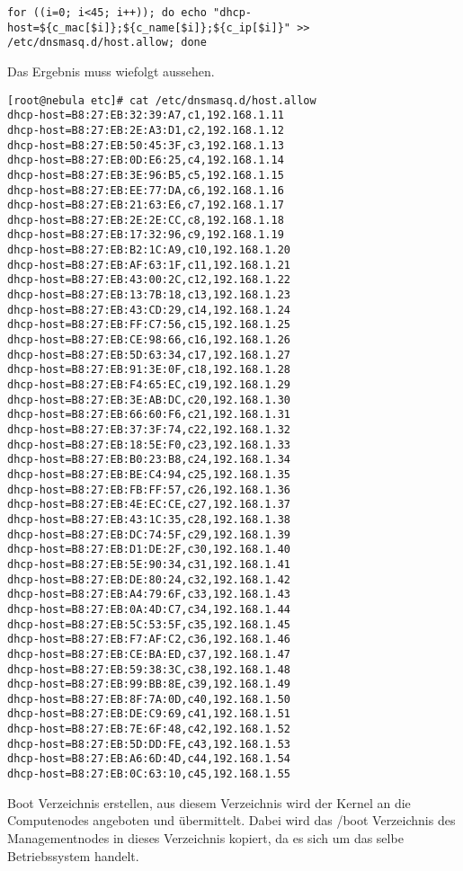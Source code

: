 \begin{lstlisting}
for ((i=0; i<45; i++)); do echo "dhcp-host=${c_mac[$i]};${c_name[$i]};${c_ip[$i]}" >> /etc/dnsmasq.d/host.allow; done
\end{lstlisting}

Das Ergebnis muss wiefolgt aussehen.
\begin{lstlisting}
[root@nebula etc]# cat /etc/dnsmasq.d/host.allow
dhcp-host=B8:27:EB:32:39:A7,c1,192.168.1.11
dhcp-host=B8:27:EB:2E:A3:D1,c2,192.168.1.12
dhcp-host=B8:27:EB:50:45:3F,c3,192.168.1.13
dhcp-host=B8:27:EB:0D:E6:25,c4,192.168.1.14
dhcp-host=B8:27:EB:3E:96:B5,c5,192.168.1.15
dhcp-host=B8:27:EB:EE:77:DA,c6,192.168.1.16
dhcp-host=B8:27:EB:21:63:E6,c7,192.168.1.17
dhcp-host=B8:27:EB:2E:2E:CC,c8,192.168.1.18
dhcp-host=B8:27:EB:17:32:96,c9,192.168.1.19
dhcp-host=B8:27:EB:B2:1C:A9,c10,192.168.1.20
dhcp-host=B8:27:EB:AF:63:1F,c11,192.168.1.21
dhcp-host=B8:27:EB:43:00:2C,c12,192.168.1.22
dhcp-host=B8:27:EB:13:7B:18,c13,192.168.1.23
dhcp-host=B8:27:EB:43:CD:29,c14,192.168.1.24
dhcp-host=B8:27:EB:FF:C7:56,c15,192.168.1.25
dhcp-host=B8:27:EB:CE:98:66,c16,192.168.1.26
dhcp-host=B8:27:EB:5D:63:34,c17,192.168.1.27
dhcp-host=B8:27:EB:91:3E:0F,c18,192.168.1.28
dhcp-host=B8:27:EB:F4:65:EC,c19,192.168.1.29
dhcp-host=B8:27:EB:3E:AB:DC,c20,192.168.1.30
dhcp-host=B8:27:EB:66:60:F6,c21,192.168.1.31
dhcp-host=B8:27:EB:37:3F:74,c22,192.168.1.32
dhcp-host=B8:27:EB:18:5E:F0,c23,192.168.1.33
dhcp-host=B8:27:EB:B0:23:B8,c24,192.168.1.34
dhcp-host=B8:27:EB:BE:C4:94,c25,192.168.1.35
dhcp-host=B8:27:EB:FB:FF:57,c26,192.168.1.36
dhcp-host=B8:27:EB:4E:EC:CE,c27,192.168.1.37
dhcp-host=B8:27:EB:43:1C:35,c28,192.168.1.38
dhcp-host=B8:27:EB:DC:74:5F,c29,192.168.1.39
dhcp-host=B8:27:EB:D1:DE:2F,c30,192.168.1.40
dhcp-host=B8:27:EB:5E:90:34,c31,192.168.1.41
dhcp-host=B8:27:EB:DE:80:24,c32,192.168.1.42
dhcp-host=B8:27:EB:A4:79:6F,c33,192.168.1.43
dhcp-host=B8:27:EB:0A:4D:C7,c34,192.168.1.44
dhcp-host=B8:27:EB:5C:53:5F,c35,192.168.1.45
dhcp-host=B8:27:EB:F7:AF:C2,c36,192.168.1.46
dhcp-host=B8:27:EB:CE:BA:ED,c37,192.168.1.47
dhcp-host=B8:27:EB:59:38:3C,c38,192.168.1.48
dhcp-host=B8:27:EB:99:BB:8E,c39,192.168.1.49
dhcp-host=B8:27:EB:8F:7A:0D,c40,192.168.1.50
dhcp-host=B8:27:EB:DE:C9:69,c41,192.168.1.51
dhcp-host=B8:27:EB:7E:6F:48,c42,192.168.1.52
dhcp-host=B8:27:EB:5D:DD:FE,c43,192.168.1.53
dhcp-host=B8:27:EB:A6:6D:4D,c44,192.168.1.54
dhcp-host=B8:27:EB:0C:63:10,c45,192.168.1.55
\end{lstlisting}

Boot Verzeichnis erstellen, aus diesem Verzeichnis wird der Kernel an die Computenodes angeboten und übermittelt. Dabei wird das /boot Verzeichnis des Managementnodes in dieses Verzeichnis kopiert, da es sich um das selbe Betriebssystem handelt.

